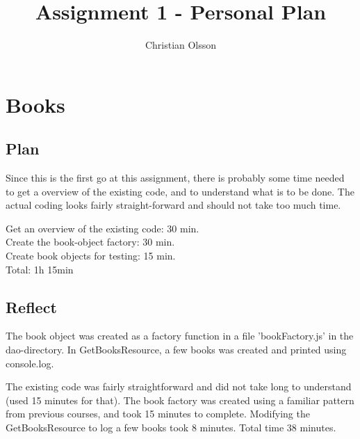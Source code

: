 \documentclass[fleqn,a4paper,11pt]{article}
\title{Assignment 1 - Personal Plan}
\author{Christian Olsson}
\begin{document}
\maketitle                      %

\thispagestyle{empty}           %

\newpage                        %

\section{Books}
\subsection{Plan}
Since this is the first go at this assignment, there is probably some time needed to
get a overview of the existing code, and to understand what is to be done. The actual coding looks fairly straight-forward and should not take too much time. 

Get an overview of the existing code: 30 min.\\
Create the book-object factory: 30 min.\\
Create book objects for testing: 15 min.\\
Total: 1h 15min

\subsection{Reflect}
The book object was created as a factory function in a file 'bookFactory.js' in the dao-directory. In GetBooksResource, a few books was created and printed using console.log.

The existing code was fairly straightforward and did not take long to understand (used 15 minutes for that). The book factory was created using a familiar pattern from previous courses, and took 15 minutes to complete. Modifying the GetBooksResource to log  a few books took 8 minutes. Total time 38 minutes.
\end{document}
